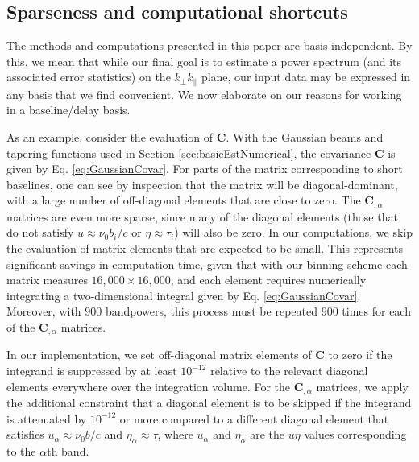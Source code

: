 \documentclass[twocolumn,aps,prd,nofootinbib,showpacs]{revtex4-1}
\begin{document}
\subsection{Sparseness and computational shortcuts}

The methods and computations presented in this paper are basis-independent.  By this, we mean that while our final goal is to estimate a power spectrum (and its associated error statistics) on the $k_\perp k_\parallel$ plane, our input data may be expressed in any basis that we find convenient.  We now elaborate on our reasons for working in a baseline/delay basis.

As an example, consider the evaluation of $\mathbf{C}$.  With the Gaussian beams and tapering functions used in Section \ref{sec:basicEstNumerical}, the covariance $\mathbf{C}$ is given by  Eq. \eqref{eq:GaussianCovar}.  For parts of the matrix corresponding to short baselines, one can see by inspection that the matrix will be diagonal-dominant, with a large number of off-diagonal elements that are close to zero.  The $\mathbf{C}_{,\alpha}$ matrices are even more sparse, since many of the diagonal elements (those that do not satisfy $u \approx \nu_0 b_i / c$ or $\eta \approx \tau_i$) will also be zero.  In our computations, we skip the evaluation of matrix elements that are expected to be small.  This represents significant savings in computation time, given that with our binning scheme each matrix measures $16,000 \times 16,000$, and each element requires numerically integrating a two-dimensional integral given by  Eq. \eqref{eq:GaussianCovar}.  Moreover, with $900$ bandpowers, this process must be repeated $900$ times for each of the $\mathbf{C}_{,\alpha}$ matrices.

In our implementation, we set off-diagonal matrix elements of $\mathbf{C}$ to zero if the integrand is suppressed by at least $10^{-12}$ relative to the relevant diagonal elements everywhere over the integration volume.  For the $\mathbf{C}_{,\alpha}$ matrices, we apply the additional constraint that a diagonal element is to be skipped if the integrand is attenuated by $10^{-12}$ or more compared to a different diagonal element that satisfies $u_\alpha \approx \nu_0 b / c$ and $\eta_\alpha \approx \tau$, where $u_\alpha$ and $\eta_\alpha$ are the $u\eta$ values corresponding to the $\alpha$th band.
\end{document}
